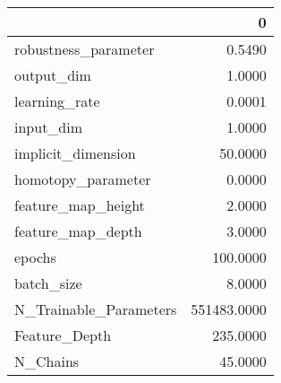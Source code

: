 \begin{tabular}{lr}
\toprule
{} &            0 \\
\midrule
robustness\_parameter   &       0.5490 \\
output\_dim             &       1.0000 \\
learning\_rate          &       0.0001 \\
input\_dim              &       1.0000 \\
implicit\_dimension     &      50.0000 \\
homotopy\_parameter     &       0.0000 \\
feature\_map\_height     &       2.0000 \\
feature\_map\_depth      &       3.0000 \\
epochs                 &     100.0000 \\
batch\_size             &       8.0000 \\
N\_Trainable\_Parameters &  551483.0000 \\
Feature\_Depth          &     235.0000 \\
N\_Chains               &      45.0000 \\
\bottomrule
\end{tabular}
